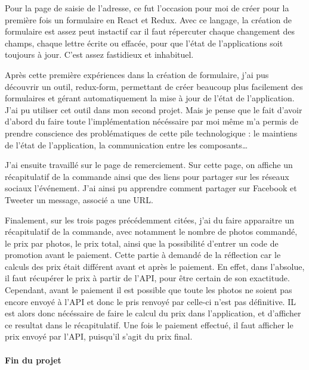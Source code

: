 \documentclass[12pt,a4paper]{article}
\begin{document}
  \bigskip

  Pour la page de saisie de l'adresse, ce fut l'occasion pour moi de créer
  pour la première fois un formulaire en React et Redux. Avec ce langage,
  la création de formulaire est assez peut instactif car il faut
  répercuter chaque changement des champs, chaque lettre écrite ou
  effacée, pour que l'état de l'applications soit toujours à jour. C'est
  assez fastidieux et inhabituel.

  \bigskip

  Après cette première expériences dans la création de formulaire, j'ai
  pus découvrir un outil, redux-form, permettant de créer beaucoup plus
  facilement des formulaires et gérant automatiquement la mise à jour de
  l'état de l'application. J'ai pu utiliser cet outil dans mon second
  projet. Mais je pense que le fait d'avoir d'abord du faire toute
  l'implémentation nécéssaire par moi même m'a permis de prendre
  conscience des problématiques de cette pile technologique : le maintiens
  de l'état de l'application, la communication entre les
  composants\ldots{}

  \bigskip

  J'ai ensuite travaillé sur le page de remerciement. Sur cette page, on
  affiche un récapitulatif de la commande ainsi que des liens pour
  partager sur les réseaux sociaux l'événement. J'ai ainsi pu apprendre
  comment partager sur Facebook et Tweeter un message, associé a une URL.

  \bigskip

  Finalement, sur les trois pages précédemment citées, j'ai du faire
  apparaitre un récapitulatif de la commande, avec notamment le nombre de
  photos commandé, le prix par photos, le prix total, ainsi que la
  possibilité d'entrer un code de promotion avant le paiement. Cette
  partie à demandé de la réflection car le calculs des prix était
  différent avant et après le paiement. En effet, dans l'absolue, il faut
  récupérer le prix à partir de l'API, pour être certain de son
  exactitude. Cependant, avant le paiement il est possible que toute les
  photos ne soient pas encore envoyé à l'API et donc le pris renvoyé par
  celle-ci n'est pas définitive. IL est alors donc nécéssaire de faire le
  calcul du prix dans l'application, et d'afficher ce resultat dans le
  récapitulatif. Une fois le paiement effectué, il faut afficher le prix
  envoyé par l'API, puisqu'il s'agit du prix final.

  \bigskip

  \paragraph{Fin du projet}\label{fin-du-projet}
\end{document}
